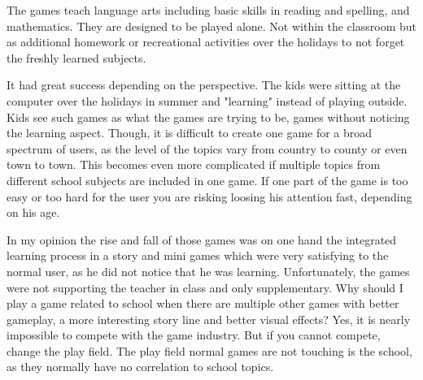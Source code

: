 The games teach language arts including basic skills in reading and spelling, and mathematics.
They are designed to be played alone. Not within the classroom but as additional homework or
recreational activities over the holidays to not forget the freshly learned subjects.

It had great success depending on the perspective. The kids were sitting at the computer over the holidays in summer
and "learning" instead of playing outside. Kids see such games as what the games are trying to be, games without noticing
the learning aspect. Though, it is difficult to create one game for a broad spectrum of users, as the level of the topics
vary from country to county or even town to town. This becomes even more complicated if multiple topics from different
school subjects are included in one game. If one part of the game is too easy or too hard for the user you are risking
loosing his attention fast, depending on his age.

In my opinion the rise and fall of those games was on one hand the integrated learning process in a story and mini games which
were very satisfying to the normal user, as he did not notice that he was learning.
Unfortunately, the games were not supporting the teacher in class and only supplementary.
Why should I play a game related to school when there are multiple other games with better gameplay,
a more interesting story line and better visual effects?
Yes, it is nearly impossible to compete with the game industry. But if you cannot compete, change the play field.
The play field normal games are not touching is the school, as they normally have no correlation to school topics.
